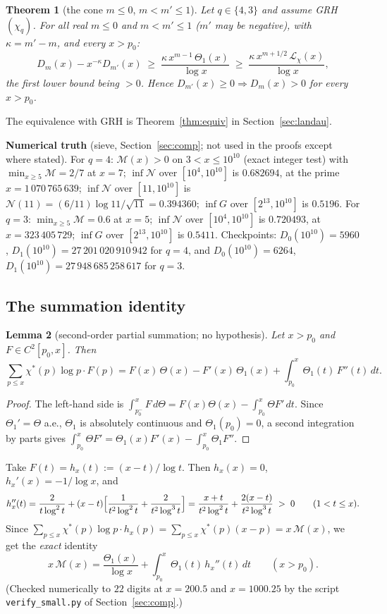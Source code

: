 \documentclass[11pt]{amsart}
\newtheorem{theorem}{Theorem}[section]
\newtheorem{lemma}[theorem]{Lemma}
\theoremstyle{definition}
\numberwithin{equation}{section}
\newcommand{\cM}{\mathcal M}          %
\newcommand{\cN}{\mathcal N}          %
\newcommand{\cL}{\mathcal L}          %
\begin{document}
\begin{theorem}[the cone $m\le0$, $m<m'\le1$]\label{thm:cone}
Let $q\in\{4,3\}$ and assume GRH$(\chi_q)$. For all real $m\le0$ and
$m<m'\le1$ ($m'$ may be negative), with $\kappa=m'-m$, and every
$x>p_0$:
\[
D_m(x)-x^{-\kappa}D_{m'}(x)\;\ge\;
\frac{\kappa\,x^{m-1}\,\Theta_1(x)}{\log x}\;\ge\;
\frac{\kappa\,x^{m+1/2}\,\cL_\chi(x)}{\log x},
\]
the first lower bound being $>0$. Hence
$D_{m'}(x)\ge0\Longrightarrow D_m(x)>0$ for every $x>p_0$.
\end{theorem}

The equivalence with GRH is Theorem~\ref{thm:equiv} in
Section~\ref{sec:landau}.

\medskip\noindent\textbf{Numerical truth} (sieve,
Section~\ref{sec:comp}; not used in the proofs except where stated).
For $q=4$: $\cM(x)>0$ on $3<x\le10^{10}$ (exact integer test) with
$\min_{x\ge5}\cM=2/7$ at $x=7$; $\inf\cN$ over $[10^4,10^{10}]$ is
$0.682694$, at the prime $x=1\,070\,765\,639$; $\inf\cN$ over
$[11,10^{10}]$ is $\cN(11)=(6/11)\log11/\sqrt{11}=0.394360$;
$\inf G$ over $[2^{13},10^{10}]$ is $0.5196$. For $q=3$:
$\min_{x\ge5}\cM=0.6$ at $x=5$; $\inf\cN$ over $[10^4,10^{10}]$ is
$0.720493$, at $x=323\,405\,729$; $\inf G$ over $[2^{13},10^{10}]$ is
$0.5411$. Checkpoints: $D_0(10^{10})=5960$,
$D_1(10^{10})=27\,201\,020\,910\,942$ for $q=4$, and
$D_0(10^{10})=6264$, $D_1(10^{10})=27\,948\,685\,258\,617$ for $q=3$.

\subsection{The summation identity}

\begin{lemma}[second-order partial summation; no hypothesis]
\label{lem:ingham}
Let $x>p_0$ and $F\in C^2[p_0,x]$. Then
\[
\sum_{p\le x}\chi^*(p)\log p\cdot F(p)
=F(x)\,\Theta(x)-F'(x)\,\Theta_1(x)+\int_{p_0}^x\Theta_1(t)\,F''(t)\,dt .
\]
\end{lemma}

\begin{proof}
The left-hand side is
$\int_{p_0^-}^xF\,d\Theta=F(x)\Theta(x)-\int_{p_0}^x\Theta F'\,dt$.
Since $\Theta_1'=\Theta$ a.e., $\Theta_1$ is absolutely continuous
and $\Theta_1(p_0)=0$, a second integration by parts gives
$\int_{p_0}^x\Theta F'=\Theta_1(x)F'(x)-\int_{p_0}^x\Theta_1F''$.
\end{proof}

Take $F(t)=h_x(t):=(x-t)/\log t$. Then $h_x(x)=0$,
$h_x'(x)=-1/\log x$, and
\begin{equation}\label{eq:hsecond}
h_x''(t)=\frac{2}{t\log^2t}+(x-t)\Bigl[\frac1{t^2\log^2t}
+\frac2{t^2\log^3t}\Bigr]
=\frac{x+t}{t^2\log^2t}+\frac{2(x-t)}{t^2\log^3t}\;>\;0
\qquad(1<t\le x).
\end{equation}
Since $\sum_{p\le x}\chi^*(p)\log p\cdot h_x(p)
=\sum_{p\le x}\chi^*(p)(x-p)=x\,\cM(x)$, we get the \emph{exact}
identity
\begin{equation}\label{eq:keyid}
x\,\cM(x)=\frac{\Theta_1(x)}{\log x}
+\int_{p_0}^x\Theta_1(t)\,h_x''(t)\,dt\qquad(x>p_0).
\end{equation}
(Checked numerically to $22$ digits at $x=200.5$ and $x=1000.25$ by
the script \texttt{verify\_small.py} of Section~\ref{sec:comp}.)
\end{document}
